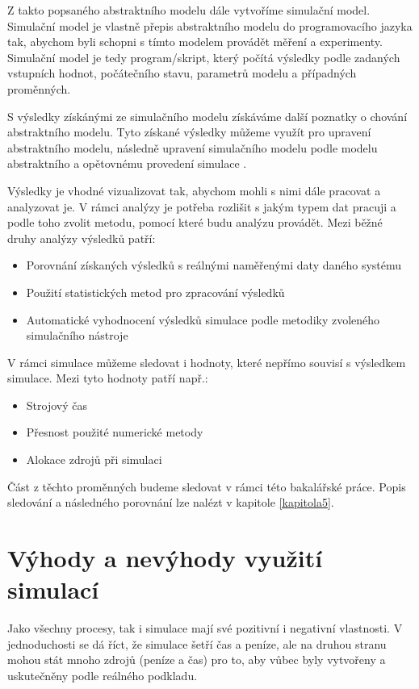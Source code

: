 Z takto popsaného abstraktního modelu dále vytvoříme simulační model. Simulační model je vlastně přepis abstraktního modelu do programovacího jazyka tak, abychom byli schopni s tímto modelem provádět měření a experimenty. Simulační model je tedy program/skript, který počítá výsledky podle zadaných vstupních hodnot, počátečního stavu, parametrů modelu a případných proměnných.

S výsledky získánými ze simulačního modelu získáváme další poznatky o chování abstraktního modelu. Tyto získané výsledky můžeme využít pro upravení abstraktního modelu, následně upravení simulačního modelu podle modelu abstraktního a opětovnému provedení simulace \cite{IMS-skripta}.

Výsledky je vhodné vizualizovat tak, abychom mohli s nimi dále pracovat a analyzovat je. V rámci analýzy je potřeba rozlišit s jakým typem dat pracuji a podle toho zvolit metodu, pomocí které budu analýzu provádět. Mezi běžné druhy analýzy výsledků patří:
\begin{itemize}
    \item Porovnání získaných výsledků s reálnými naměřenými daty daného systému
    \item Použití statistických metod pro zpracování výsledků
    \item Automatické vyhodnocení výsledků simulace podle metodiky zvoleného simulačního nástroje
\end{itemize}

V rámci simulace můžeme sledovat i hodnoty, které nepřímo souvisí s výsledkem simulace. Mezi tyto hodnoty patří např.:
\begin{itemize}
    \item Strojový čas
    \item Přesnost použité numerické metody
    \item Alokace zdrojů při simulaci
\end{itemize}

Část z těchto proměnných budeme sledovat v rámci této bakalářské práce. Popis sledování a následného porovnání lze nalézt v kapitole \ref{kapitola5}.

\section{Výhody a nevýhody využití simulací}

Jako všechny procesy, tak i simulace mají své pozitivní i negativní vlastnosti. V jednoduchosti se dá říct, že simulace šetří čas a peníze, ale na druhou stranu mohou stát mnoho zdrojů (peníze a čas) pro to, aby vůbec byly vytvořeny a uskutečněny podle reálného podkladu.

